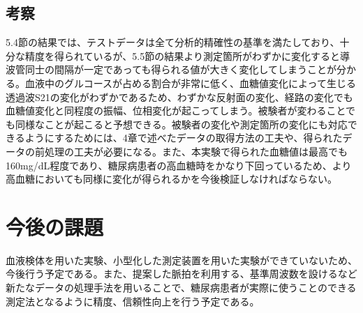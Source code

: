 \documentclass[11pt,a4paper,uplatex,draft]{ujarticle}
\begin{document}
\subsection{考察}
5.4節の結果では、テストデータは全て分析的精確性の基準を満たしており、十分な精度を得られているが、5.5節の結果より測定箇所がわずかに変化すると導波管同士の間隔が一定であっても得られる値が大きく変化してしまうことが分かる。血液中のグルコースが占める割合が非常に低く、血糖値変化によって生じる透過波S21の変化がわずかであるため、わずかな反射面の変化、経路の変化でも血糖値変化と同程度の振幅、位相変化が起こってしまう。被験者が変わることでも同様なことが起こると予想できる。被験者の変化や測定箇所の変化にも対応できるようにするためには、4章で述べたデータの取得方法の工夫や、得られたデータの前処理の工夫が必要になる。また、本実験で得られた血糖値は最高でも160mg/dL程度であり、糖尿病患者の高血糖時をかなり下回っているため、より高血糖においても同様に変化が得られるかを今後検証しなければならない。

\section{今後の課題}
血液検体を用いた実験、小型化した測定装置を用いた実験ができていないため、今後行う予定である。また、提案した脈拍を利用する、基準周波数を設けるなど新たなデータの処理手法を用いることで、糖尿病患者が実際に使うことのできる測定法となるように精度、信頼性向上を行う予定である。
\end{document}
